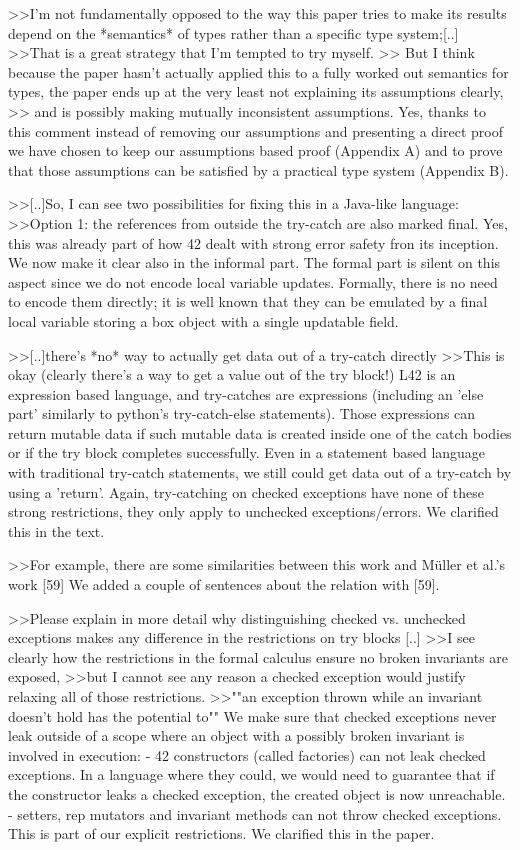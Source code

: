 >>I'm not fundamentally opposed to the way this paper tries to make its results depend on the *semantics* of types rather than a specific type system;[..]
>>That is a great strategy that I'm tempted to try myself.
>> But I think because the paper hasn't actually applied this to a fully worked out semantics for types, the paper ends up at the very least not explaining its assumptions clearly,
>> and is possibly making mutually inconsistent assumptions. 
Yes, thanks to this comment instead of removing our assumptions and presenting a direct proof we have chosen to keep our assumptions based proof (Appendix A)
and to prove that those assumptions can be satisfied by a practical type system (Appendix B).


>>[..]So, I can see two possibilities for fixing this in a Java-like language:
>>Option 1: the references from outside the try-catch are also marked final.
Yes, this was already part of how 42 dealt with strong error safety fron its inception. We now make it clear also in the informal part.
The formal part is silent on this aspect since we do not encode local variable updates.
Formally, there is no need to encode them directly; it is well known that they can be emulated by a final local variable storing a box object with a single updatable field.


>>[..]there's *no* way to actually get data out of a try-catch directly
>>This is okay (clearly there's a way to get a value out of the try block!)
L42 is an expression based language, and try-catches are expressions (including an 'else part' similarly to python's try-catch-else statements).
Those expressions can return mutable data if such mutable data is created inside one of the catch bodies or if the try block completes successfully.
Even in a statement based language with traditional try-catch statements, we still could get data out of a try-catch by using a 'return'.
Again, try-catching on checked exceptions have none of these strong restrictions, they only apply to unchecked exceptions/errors.
We clarified this in the text.

>>For example, there are some similarities between this work and Müller et al.'s work [59]
We added a couple of sentences about the relation with [59].

>>Please explain in more detail why distinguishing checked vs. unchecked exceptions makes any difference in the restrictions on try blocks [..]
>>I see clearly how the restrictions in the formal calculus ensure no broken invariants are exposed,
>>but I cannot see any reason a checked exception would justify relaxing all of those restrictions.
>>""an exception thrown while an invariant doesn't hold has the potential to""
We make sure that checked exceptions never leak outside of a scope where an object with a possibly broken invariant is involved in execution: 
  - 42 constructors (called factories) can not leak checked exceptions. In a language where they could,
   we would need to guarantee that if the constructor leaks a checked exception, the created object is now unreachable.
  - setters, rep mutators and invariant methods can not throw checked exceptions. This is part of our explicit restrictions.
We clarified this in the paper.

